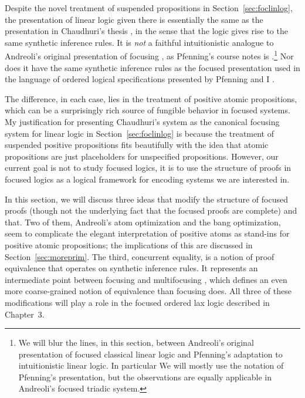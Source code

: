 Despite the novel treatment of suspended propositions in
Section~\ref{sec:foclinlog}, the presentation of linear logic given
there is essentially the same as the presentation in Chaudhuri's
thesis \cite{chaudhuri06focused}, in the sense that the logic gives
rise to the same synthetic inference rules. It is {\it not} a faithful
intuitionistic analogue to Andreoli's original presentation of focusing
\cite{andreoli92logic}, as Pfenning's course notes is
\cite{pfenning12chaining}.\footnote{We will blur the lines, in this
  section, between Andreoli's original presentation of focused
  classical linear logic and Pfenning's adaptation to intuitionistic
  linear logic. In particular We will mostly use the notation of
  Pfenning's presentation, but the observations are equally applicable
  in Andreoli's focused triadic system.}  Nor does it have the same
synthetic inference rules as the focused presentation used in the
language of ordered logical specifications presented by Pfenning and I
\cite{pfenning09substructural}.

The difference, in each case, lies in the treatment of positive atomic
propositions, which can be a surprisingly rich source of fungible
behavior in focused systems. My justification for presenting
Chaudhuri's system as the canonical focusing system for linear logic
in Section~\ref{sec:foclinlog} is because the treatment of suspended
positive propositions fits beautifully with the idea that atomic
propositions are just placeholders for unspecified
propositions. However, our current goal is not to study focused
logics, it is to use the structure of proofs in focused logics as a
logical framework for encoding systems we are interested in. 

In this section, we will discuss three ideas that modify the structure
of focused proofs (though not the underlying fact that the focused
proofs are complete) and that. Two of them, Andreoli's atom
optimization and the bang optimization, seem to complicate the elegant
interpretation of positive atoms as stand-ins for positive atomic
propositions; the implications of this are discussed in
Section~\ref{sec:moreprim}. The third, concurrent equality, is a
notion of proof equivalence that operates on synthetic inference
rules. It represents an intermediate point between focusing and
multifocusing \cite{chaudhuri08canonical}, which defines an even more
coarse-grained notion of equivalence than focusing does.  All three of
these modifications will play a role in the focused ordered lax logic
described in Chapter~3.

